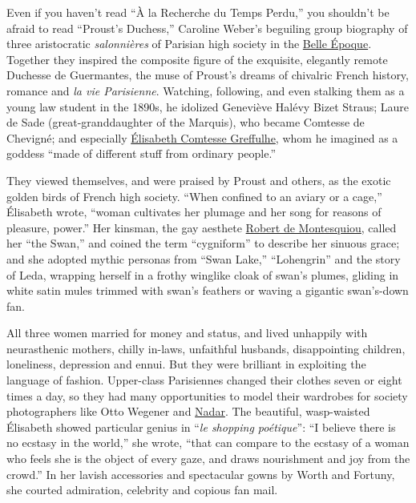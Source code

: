 Even if you haven't read ``À la Recherche du Temps Perdu,'' you
shouldn't be afraid to read ``Proust's Duchess,'' Caroline Weber's
beguiling group biography of three aristocratic \emph{salonnières} of
Parisian high society in the
\href{https://www.mdc.edu/wolfson/academic/artsletters/art_philosophy/humanities/belleepoque.htm}{Belle
Époque}. Together they inspired the composite figure of the exquisite,
elegantly remote Duchesse de Guermantes, the muse of Proust's dreams of
chivalric French history, romance and \emph{la vie Parisienne}.
Watching, following, and even stalking them as a young law student in
the 1890s, he idolized Geneviève Halévy Bizet Straus; Laure de Sade
(great-granddaughter of the Marquis), who became Comtesse de Chevigné;
and especially
\href{http://www.fitnyc.edu/museum/exhibitions/prousts-muse.php}{Élisabeth
Comtesse Greffulhe}, whom he imagined as a goddess ``made of different
stuff from ordinary people.''

They viewed themselves, and were praised by Proust and others, as the
exotic golden birds of French high society. ``When confined to an aviary
or a cage,'' Élisabeth wrote, ``woman cultivates her plumage and her
song for reasons of pleasure, power.'' Her kinsman, the gay aesthete
\href{https://bonjourparis.com/history/robert-de-montesquiou/}{Robert de
Montesquiou}, called her ``the Swan,'' and coined the term ``cygniform''
to describe her sinuous grace; and she adopted mythic personas from
``Swan Lake,'' ``Lohengrin'' and the story of Leda, wrapping herself in
a frothy winglike cloak of swan's plumes, gliding in white satin mules
trimmed with swan's feathers or waving a gigantic swan's-down fan.

All three women married for money and status, and lived unhappily with
neurasthenic mothers, chilly in-laws, unfaithful husbands, disappointing
children, loneliness, depression and ennui. But they were brilliant in
exploiting the language of fashion. Upper-class Parisiennes changed
their clothes seven or eight times a day, so they had many opportunities
to model their wardrobes for society photographers like Otto Wegener and
\href{https://publicdomainreview.org/collections/photographs-of-the-famous-by-felix-nadar/}{Nadar}.
The beautiful, wasp-waisted Élisabeth showed particular genius in
``\emph{le shopping poétique}'': ``I believe there is no ecstasy in the
world,'' she wrote, ``that can compare to the ecstasy of a woman who
feels she is the object of every gaze, and draws nourishment and joy
from the crowd.'' In her lavish accessories and spectacular gowns by
Worth and Fortuny, she courted admiration, celebrity and copious fan
mail.

